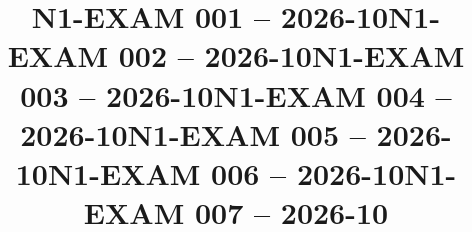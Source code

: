 \documentclass{ip-exam}
\title{N1-EXAM 001 -- 2026-10}
\begin{document}
\makeexamheader








\cleartoeven
\setcounter{questioncounter}{0}
\setcounter{page}{1}
\title{N1-EXAM 002 -- 2026-10}
\makeexamheader








\cleartoeven
\setcounter{questioncounter}{0}
\setcounter{page}{1}
\title{N1-EXAM 003 -- 2026-10}
\makeexamheader








\cleartoeven
\setcounter{questioncounter}{0}
\setcounter{page}{1}
\title{N1-EXAM 004 -- 2026-10}
\makeexamheader








\cleartoeven
\setcounter{questioncounter}{0}
\setcounter{page}{1}
\title{N1-EXAM 005 -- 2026-10}
\makeexamheader








\cleartoeven
\setcounter{questioncounter}{0}
\setcounter{page}{1}
\title{N1-EXAM 006 -- 2026-10}
\makeexamheader








\cleartoeven
\setcounter{questioncounter}{0}
\setcounter{page}{1}
\title{N1-EXAM 007 -- 2026-10}
\makeexamheader
\end{document}
